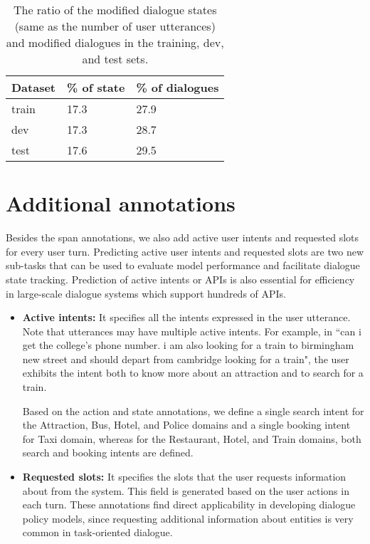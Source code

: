 \begin{table}[t]
\centering 
    \begin{tabular}[t]{|C{14mm}|C{20mm}|C{28mm}|}\hline
            \textbf{Dataset} & \textbf{\% of state} & \textbf{\% of dialogues} \\\hline
           train & 17.3 & 27.9 \\ \hline
           dev & 17.3 & 28.7  \\\hline
           test & 17.6 & 29.5 \\\hline
    \end{tabular}
    \setlength{\belowcaptionskip}{-10pt}
    \caption{The ratio of the modified dialogue states (same as the number of user utterances) and  modified dialogues in the training, dev, and test sets.}
    \label{tab:correction_rate}
\end{table}

\section{Additional annotations}\label{sec:additional}
Besides the span annotations, we also add active user intents and requested slots for every user turn. Predicting active user intents and requested slots are two new sub-tasks that can be used to evaluate model performance and facilitate dialogue state tracking. Prediction of active intents or APIs is also essential for efficiency in large-scale dialogue systems which support hundreds of APIs.

\begin{itemize}[leftmargin=*]
    \item \textbf{Active intents:} It specifies all the intents expressed in the user utterance. Note that utterances may have multiple active intents. For example, in ``can i get the college's phone number. i am also looking for a train to birmingham new street and should depart from cambridge looking for a train", the user exhibits the intent both to know more about an attraction and to search for a train.

    
Based on the action and state annotations, we define a single search intent for the Attraction, Bus, Hotel, and Police domains and a single booking intent for Taxi domain, whereas for the Restaurant, Hotel, and Train domains, both search and booking intents are defined. 

    \item \textbf{Requested slots:} It specifies the slots that the user requests information about from the system. This field is generated based on the user actions in each turn. These annotations find direct applicability in developing  dialogue policy models, since requesting additional information about entities is very common in task-oriented dialogue.
\end{itemize}

